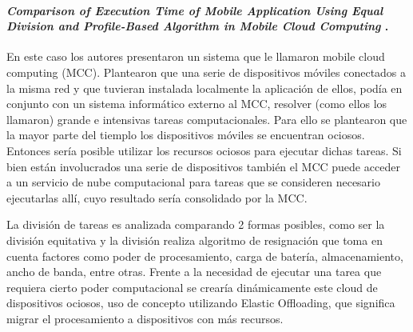 
\paragraph{
    \textbf{\emph{Comparison of Execution Time of Mobile
            Application Using Equal Division
            and Profile-Based Algorithm in Mobile
            Cloud Computing}
    }
    \cite[pág. 59]{chaudhary_microservices_2020}.
}

En este caso los autores presentaron un sistema que le llamaron mobile cloud computing (MCC).
Plantearon que una serie de dispositivos móviles conectados a la misma red y que tuvieran instalada localmente la aplicación de ellos, podía en conjunto con un sistema informático externo al MCC, resolver (como ellos los llamaron) grande e intensivas tareas computacionales. Para ello se plantearon que la mayor parte del tiemplo los dispositivos móviles se encuentran ociosos. Entonces sería posible utilizar los recursos ociosos para ejecutar dichas tareas. Si bien están involucrados una serie de dispositivos también el MCC puede acceder a un servicio de nube computacional para tareas que se consideren necesario ejecutarlas allí, cuyo resultado sería consolidado por la MCC.

La división de tareas es analizada comparando 2 formas posibles, como ser la división equitativa y la división realiza algoritmo de resignación que toma en cuenta factores como poder de procesamiento, carga de batería,
almacenamiento, ancho de banda, entre otras.
Frente a la necesidad de ejecutar una tarea que requiera cierto poder computacional se crearía dinámicamente este cloud de dispositivos ociosos,
uso de concepto utilizando Elastic Offloading, que significa migrar el procesamiento a dispositivos con más recursos.

